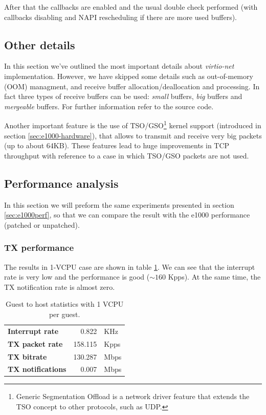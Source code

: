 After that the callbacks are enabled and the usual double check performed (with callbacks disabling and NAPI rescheduling if there are
more used buffers).


\subsection{Other details}
In this section we've outlined the most important details about \emph{virtio-net} implementation. However, we have skipped some details
such as out-of-memory (OOM) managment, and receive buffer allocation/deallocation and processing.
In fact three types of receive buffers can be used: \emph{small} buffers, \emph{big} buffers and \emph{mergeable} buffers. For further
information refer to the source code.

\vspace{0.5cm}

Another important feature is the use of TSO/GSO\footnote{Generic Segmentation Offload is a network driver feature that extends the TSO
concept to other protocols, such as UDP.} kernel support (introduced in section \ref{sec:e1000-hardware}), that allows to transmit
and receive very big packets (up to about 64KB). These features lead to huge improvements in TCP throughput with reference to a case in
which TSO/GSO packets are not used.


\subsection{Performance analysis}
In this section we will preform the same experiments presented in section \ref{sec:e1000perf}, so that we can compare the result with
the e1000 performance (patched or unpatched).

\subsubsection{TX performance}
\label{sec:virtionet-perf-tx}
The results in 1-VCPU case are shown in table \ref{tab:virtionet-tx-g2h1vcpu}. We can see that the interrupt rate is very low and the
performance is good ($\sim 160$ Kpps). At the same time, the TX notification rate is almost zero. 

\begin{table}
\begin{center}
\begin{tabular}{lrl}
\toprule
\textbf{Interrupt rate} & 0.822 & KHz\\
\textbf{TX packet rate} & 158.115 & Kpps\\
\textbf{TX bitrate} & 130.287 & Mbps\\
\textbf{TX notifications} & 0.007 & Mbps\\
\bottomrule
\end{tabular}
\end{center}
\caption{Guest to host statistics with 1 VCPU per guest.}
\label{tab:virtionet-tx-g2h1vcpu}
\end{table}

